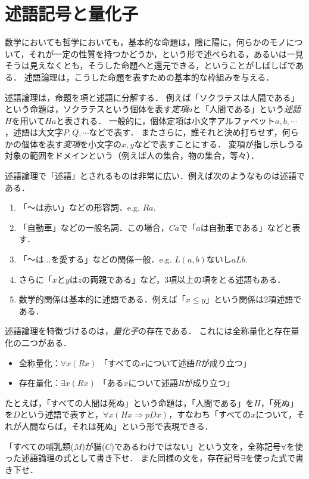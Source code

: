 \documentclass[11pt,a4paper]{jsarticle}
\begin{document}
\section{述語記号と量化子}
数学においても哲学においても，基本的な命題は，陰に陽に，何らかのモノについて，それが一定の性質を持つかどうか，という形で述べられる，あるいは一見そうは見えなくとも，そうした命題へと還元できる，ということがしばしばである．
述語論理は，こうした命題を表すための基本的な枠組みを与える．

述語論理は，命題を項と述語に分解する．
例えば「ソクラテスは人間である」という命題は，ソクラテスという個体を表す\emph{定項}$a$と「人間である」という\emph{述語}$H$を用いて$Ha$と表される．
一般的に，個体定項は小文字アルファベット$a, b, \cdots$，述語は大文字$P, Q, \cdots$などで表す．
またさらに，誰それと決め打ちせず，何らかの個体を表す\emph{変項}を小文字の$x, y$などで表すことにする． 
変項が指し示しうる対象の範囲をドメインという（例えば人の集合，物の集合，等々）．

述語論理で「述語」とされるものは非常に広い．例えば次のようなものは述語である．
\begin{enumerate}
    \item 「〜は赤い」などの形容詞．e.g. $Ra$.
    \item 「自動車」などの一般名詞．この場合，$Ca$で「$a$は自動車である」などと表す．
    \item 「〜は...を愛する」などの関係一般．e.g. $L(a,b)$ないし$aLb$. 
    \item さらに「$x$と$y$は$z$の両親である」など，3項以上の項をとる述語もある．
    \item 数学的関係は基本的に述語である．例えば「$x \leq y$」という関係は2項述語である．
\end{enumerate}

述語論理を特徴づけるのは，\emph{量化子}の存在である．
これには全称量化と存在量化の二つがある．
\begin{itemize}
 \item 全称量化：$\forall x (Rx)$ 「すべての$x$について述語$R$が成り立つ」
 \item 存在量化：$\exists x (Rx)$ 「ある$x$について述語$R$が成り立つ」
\end{itemize}
たとえば，「すべての人間は死ぬ」という命題は，「人間である」を$H$，「死ぬ」を$D$という述語で表すと，$\forall x (Hx \Rightarrow pDx)$，すなわち「すべての$x$について，それが人間ならば，それは死ぬ」という形で表現できる．

\begin{exercise}
    「すべての哺乳類($M$)が猫($C$)であるわけではない」という文を，全称記号$\forall$を使った述語論理の式として書き下せ．    また同様の文を，存在記号$\exists$を使った式で書き下せ．
\end{exercise}
\end{document}
